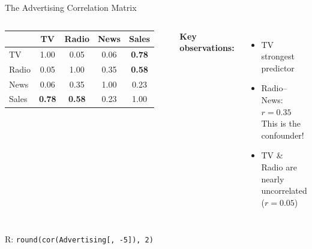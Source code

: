 \documentclass[aspectratio=169, 11pt]{beamer}
\begin{document}
\begin{frame}{The Advertising Correlation Matrix}

\begin{columns}
\begin{tabular}{lcccc}
\toprule
 & TV & Radio & News & Sales \\
\midrule
TV & 1.00 & 0.05 & 0.06 & \textcolor{softgreen}{\textbf{0.78}} \\
Radio & 0.05 & 1.00 & \textcolor{amber}{0.35} & \textcolor{softgreen}{\textbf{0.58}} \\
News & 0.06 & \textcolor{amber}{0.35} & 1.00 & 0.23 \\
Sales & \textcolor{softgreen}{\textbf{0.78}} & \textcolor{softgreen}{\textbf{0.58}} & 0.23 & 1.00 \\
\bottomrule
\end{tabular}

\textbf{Key observations:}

\begin{itemize}
  \item TV strongest predictor
  \item Radio--News: $r = 0.35$\\
    This is the confounder!
  \item TV \& Radio are nearly\\
    uncorrelated ($r = 0.05$)
\end{itemize}
\end{columns}

\vspace{0.5em}
\centering
\footnotesize R: \texttt{round(cor(Advertising[, -5]), 2)}
\end{frame}
\end{document}
